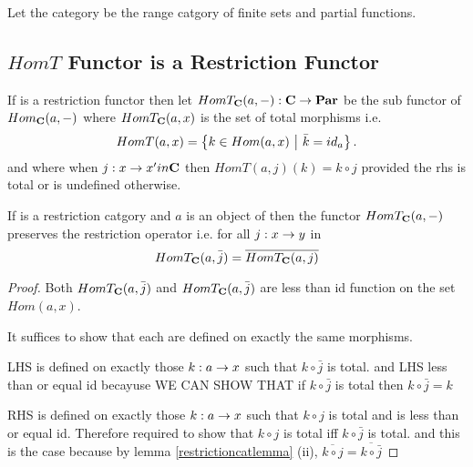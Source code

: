 \documentclass[10pt,a4paper]{article}
\theoremstyle{remark}
\begin{document}
Let the category \FinPar be the range catgory of finite sets and partial functions.

\subsection{$HomT$ Functor is a Restriction Functor}
If \catcw is a restriction functor then
let $HomT_{\textbf{C}}(a,-): \textbf{C} \rightarrow \textbf{Par}$ be the sub functor of $Hom_{\textbf{C}}(a,-)$
where $HomT_{\textbf{C}}(a,x)$ is the set of total morphisms i.e.
$$HomT(a,x)=\left\{k \in Hom(a,x) \ \middle|\ \bar{k}=id_a\right\}.$$
and where when $j:x \rightarrow x' in \textbf{C}$ then $HomT(a,j)(k)=k \circ j$ provided the rhs is total or is undefined otherwise.  
 
\begin{lemma}
If \catcw is a restriction catgory and $a$ is an object of \catcw 
then the functor $HomT_{\textbf{C}}(a,-)$ preserves the restriction operator i.e.
for all $j:x \rightarrow y$ in \catc
$$HomT_{\textbf{C}}(a,\bar{j})=\overline{HomT_{\textbf{C}}(a,j)}$$
\end{lemma}
\begin{proof}
Both $HomT_{\textbf{C}}(a,\bar{j})$ and $HomT_{\textbf{C}}(a,\bar{j})$ are less than id function on 
the set $Hom(a,x)$. 


It suffices to show that each are defined on exactly the same morphisms.

LHS is defined on exactly those $k:a \rightarrow x$ such that $k \circ \bar{j}$ is total.
and LHS less than or equal id becayuse
WE CAN SHOW THAT if $k \circ \bar{j}$ is total then $k \circ \bar{j}=k$

RHS is defined on exactly those $k:a \rightarrow x$ such that $k \circ j$ is total
and is less than or equal id. Therefore required to show that
$k \circ j$ is total iff $k \circ \bar{j}$ is total. and this is the case 
because by 
lemma \ref{restrictioncatlemma} (ii), $\overline{k \circ j}=\overline{k \circ \bar{j}}$ 
\end{proof}
\end{document}
